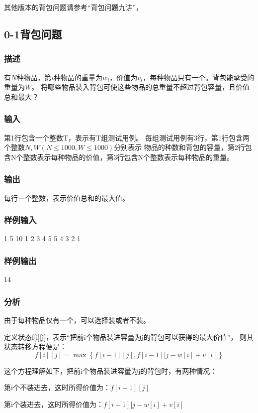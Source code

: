 其他版本的背包问题请参考“背包问题九讲”，

\subsection{0-1背包问题}

\subsubsection{描述}
有$N$种物品，第$i$种物品的重量为$w_i$，价值为$v_i$，每种物品只有一个。背包能承受的重量为$W$。
将哪些物品装入背包可使这些物品的总重量不超过背包容量，且价值总和最大？

\subsubsection{输入}
第1行包含一个整数T，表示有T组测试用例。
每组测试用例有3行，第1行包含两个整数$N, W(N \leq 1000 , W \leq 1000)$分别表示
物品的种数和背包的容量，第2行包含N个整数表示每种物品的价值，第3行包含N个整数表示每种物品的重量。

\subsubsection{输出}
每行一个整数，表示价值总和的最大值。

\subsubsection{样例输入}
\begin{Code}
1
5 10
1 2 3 4 5
5 4 3 2 1
\end{Code}

\subsubsection{样例输出}
\begin{Code}
14
\end{Code}

\subsubsection{分析}
由于每种物品仅有一个，可以选择装或者不装。

定义状态f[i][j]，表示“把前i个物品装进容量为j的背包可以获得的最大价值”，
则其状态转移方程便是：
$$f[i][j]=\max\left\{f[i-1][j], f[i-1][j-w[i]+v[i]\right\}$$

这个方程理解如下，把前i个物品装进容量为j的背包时，有两种情况：
\begindot
\item 第i个不装进去，这时所得价值为：$f[i-1][j]$
\item 第i个装进去，这时所得价值为：$f[i-1][j-w[i]+v[i]$
\myenddot

